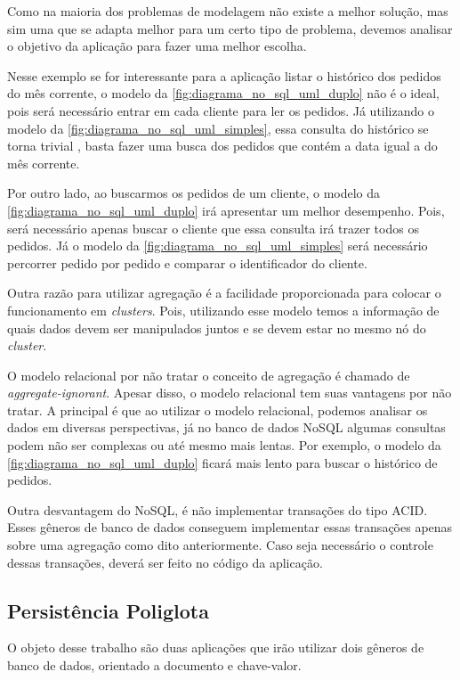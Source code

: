 Como na maioria dos problemas de modelagem não existe a melhor solução, mas sim uma que se adapta melhor para um certo tipo de problema, devemos analisar o objetivo da aplicação para fazer uma melhor escolha.

Nesse exemplo se for interessante para a aplicação listar o histórico dos pedidos do mês corrente, o modelo da \autoref{fig:diagrama_no_sql_uml_duplo} não é o ideal, pois será necessário entrar em cada cliente para ler os pedidos. Já utilizando o modelo da \autoref{fig:diagrama_no_sql_uml_simples}, essa consulta do histórico se torna trivial \cite{NoSQL}, basta fazer uma busca dos pedidos que contém a data igual a do mês corrente.

Por outro lado, ao buscarmos os pedidos de um cliente, o modelo da \autoref{fig:diagrama_no_sql_uml_duplo} irá apresentar um melhor desempenho. Pois, será necessário apenas buscar o cliente que essa consulta irá trazer todos os pedidos. Já o modelo da \autoref{fig:diagrama_no_sql_uml_simples} será necessário percorrer pedido por pedido e comparar o identificador do cliente.

Outra razão para utilizar agregação é a facilidade proporcionada para colocar o funcionamento em \textit{clusters}. Pois, utilizando esse modelo temos a informação de quais dados devem ser manipulados juntos e se devem estar no mesmo nó do \textit{cluster}.

O modelo relacional por não tratar o conceito de agregação é chamado de \textit{aggregate-ignorant}. Apesar disso, o modelo relacional tem suas vantagens por não tratar. A principal é que ao utilizar o modelo relacional, podemos analisar os dados em diversas perspectivas, já no banco de dados NoSQL algumas consultas podem não ser complexas ou até mesmo mais lentas. Por exemplo, o modelo da \autoref{fig:diagrama_no_sql_uml_duplo} ficará mais lento para buscar o histórico de pedidos.

Outra desvantagem do NoSQL, é não implementar transações do tipo \ac{ACID}. Esses gêneros de banco de dados conseguem implementar essas transações apenas sobre uma agregação como dito anteriormente. Caso seja necessário o controle dessas transações, deverá ser feito no código da aplicação.

\subsection{Persistência Poliglota}
\label{subsec:polyglotpersitence}

O objeto desse trabalho são duas aplicações que irão utilizar dois gêneros de banco de dados, orientado a documento e chave-valor.

